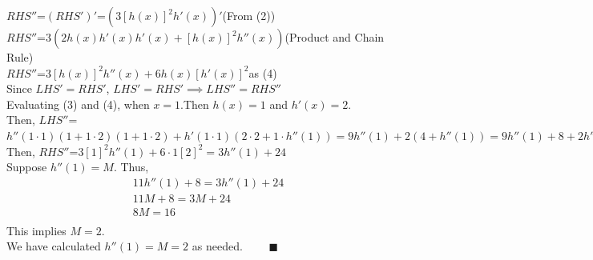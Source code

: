 \documentclass[12pt]{exam}
\newcommand {\DS} [1] {${\displaystyle #1}$}
\begin{document}
\begin{enumerate}[resume]
	\DS{RHS''}=\DS{(RHS')'}=$(3[h(x)]^2h'(x))'$\qquad(From (2))\\
	\DS{RHS''}=$3(2h(x)h'(x)h'(x)+[h(x)]^2h''(x))$\qquad(Product and Chain Rule)\\
	\DS{RHS''}=$3[h(x)]^2h''(x)+6h(x)[h'(x)]^2$\qquad as (4)\\
	Since $LHS'=RHS'$, $LHS'=RHS' \implies LHS''=RHS''$\\
	Evaluating (3) and (4), when $x=1$.Then $h(x)=1$ and $h'(x)=2$. \\
	Then, \DS{LHS''}=$h''(1\cdot1)(1+1\cdot2)(1+1\cdot2)+h'(1\cdot1)(2\cdot2+1\cdot h''(1))=9h''(1)+2(4+h''(1))=9h''(1)+8+2h''(1)=11h''(1)+8$\\
	Then, \DS{RHS''}=$3[1]^2h''(1)+6\cdot1[2]^2=3h''(1)+24$\\
	Suppose $h''(1)=M.$
	Thus,
	\begin{align*}
	    11h''(1)+8=3h''(1)+24\\
	    11M+8=3M+24\\
	    8M=16\\
	\end{align*}
	This implies $M=2.$\\
	We have calculated $h''(1)=M=2$ as needed. $\quad \quad \blacksquare$


\end{enumerate}
\end{document}
